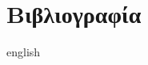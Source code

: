 \cleardoublepage
{}
{}
\chapter*{Βιβλιογραφία}


\nocite{*}

\begin{otherlanguage*}{english}
  \printbibliography[heading=none]
\end{otherlanguage*}
